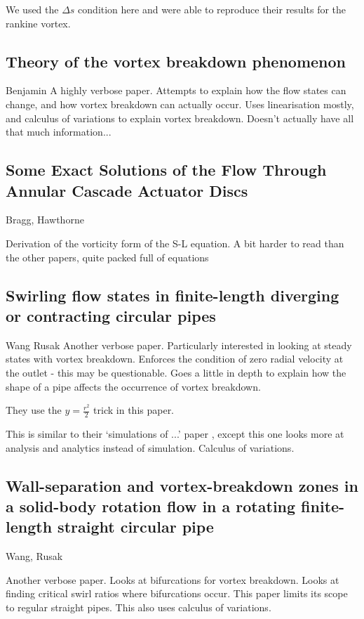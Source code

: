 \documentclass{X:/Documents/Coding/Latex/myreport}
\begin{document}
We used the $\Delta s$ condition here and were able to reproduce their results for the rankine vortex.


\subsection{Theory of the vortex breakdown phenomenon}
Benjamin
A highly verbose paper. Attempts to explain how the flow states can change, and how vortex breakdown can actually occur. Uses linearisation mostly, and calculus of variations to explain vortex breakdown.
Doesn't actually have all that much information...


\subsection{Some Exact Solutions of the Flow Through Annular Cascade Actuator Discs}
Bragg, Hawthorne

Derivation of the vorticity form of the S-L equation.
A bit harder to read than the other papers, quite packed full of equations



\subsection{Swirling flow states in finite-length diverging or contracting circular pipes}
Wang Rusak
Another verbose paper. Particularly interested in looking at steady states with vortex breakdown. 
Enforces the condition of zero radial velocity at the outlet - this may be questionable.
Goes a little in depth to explain how the shape of a pipe affects the occurrence of vortex breakdown.

They use the $y = \frac{r^2}{2}$ trick in this paper.

This is similar to their `simulations of ...' paper , except this one looks more at analysis and analytics instead of simulation.
Calculus of variations.

\subsection{Wall-separation and vortex-breakdown zones in a solid-body rotation flow in a rotating finite-length straight circular pipe}
Wang, Rusak

Another verbose paper. Looks at bifurcations for vortex breakdown. Looks at finding critical swirl ratios where bifurcations occur. This paper limits its scope to regular straight pipes. This also uses calculus of variations.
\end{document}
